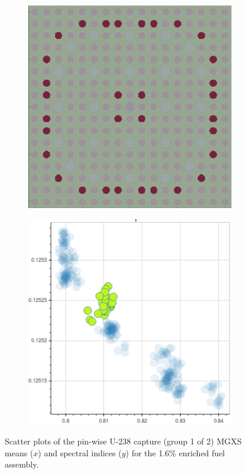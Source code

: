 \begin{figure}[h!]
\begin{subfigure}{0.42\textwidth}
  \caption{}
  \label{fig:chap10-capt-mean-spect-ind-mgxs-2}
\end{subfigure}
\begin{subfigure}{0.42\textwidth}
  \centering
  \includegraphics[width=0.9\linewidth]{figures/unsupervised/features/assm-16/u238-capt/mean-spect-ind/geometry-3}
  \caption{}
  \label{fig:chap10-capt-mean-spect-ind-geom-3}
\end{subfigure}%
\begin{subfigure}{0.42\textwidth}
  \centering
  \includegraphics[width=0.9\linewidth]{figures/unsupervised/features/assm-16/u238-capt/mean-spect-ind/mgxs-3}
  \caption{}
  \label{fig:chap10-capt-mean-spect-ind-mgxs-3}
\end{subfigure}
\caption[Clustering of U-238 capture MGXS spectral indices]{Scatter plots of the pin-wise U-238 capture (group 1 of 2) \ac{MGXS} means ($x$) and spectral indices ($y$) for the 1.6\% enriched fuel assembly.}
\label{fig:chap10-mean-spect-ind}
\end{figure}

